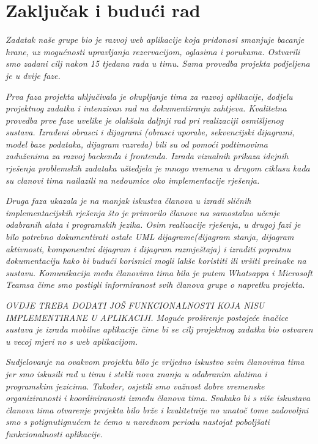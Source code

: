 \chapter{Zaključak i budući rad}
		
		 \textit{Zadatak naše grupe bio je razvoj web aplikacije koja pridonosi smanjuje bacanje hrane, uz mogućnosti upravljanja rezervacijom, oglasima i porukama. Ostvarili smo zadani cilj nakon 15 tjedana rada u timu. Sama provedba projekta podjeljena je u dvije faze.}
		 
		 \textit{Prva faza projekta uključivala je okupljanje tima za razvoj aplikacije, dodjelu projektnog zadatka i intenzivan rad na dokumentiranju zahtjeva. Kvalitetna provedba prve faze uvelike je olakšala daljnji rad pri realizaciji osmišljenog sustava. Izrađeni obrasci i dijagrami (obrasci uporabe, sekvencijski dijagrami, model baze podataka, dijagram razreda) bili su od pomoći podtimovima zaduženima za razvoj backenda i frontenda. Izrada vizualnih prikaza idejnih rješenja problemskih zadataka uštedjela je mnogo vremena u drugom ciklusu kada su clanovi tima nailazili na nedoumice oko implementacije rješenja.}
		 
		 \textit{Druga faza ukazala je na manjak iskustva članova u izradi sličnih implementacijskih rješenja što je primorilo članove na samostalno učenje odabranih alata i programskih jezika. Osim realizacije rješenja, u drugoj fazi je bilo potrebno dokumentirati ostale UML dijagrame(dijagram stanja, dijagram aktivnosti, komponentni dijagram i dijagram razmještaja) i izraditi popratnu dokumentaciju kako bi budući korisnici mogli lakše koristiti ili vršiti preinake na sustavu. Komunikacija među članovima tima bila je putem Whatsappa i Microsoft Teamsa čime smo postigli informiranost svih članova grupe o napretku projekta. }
		 
		 \textit{OVDJE TREBA DODATI JOŠ FUNKCIONALNOSTI KOJA NISU IMPLEMENTIRANE U APLIKACIJI. Moguće proširenje postojeće inačice sustava je izrada mobilne aplikacije čime bi se cilj projektnog zadatka bio ostvaren u vecoj mjeri no s web aplikacijom.}
		 
		 \textit{Sudjelovanje na ovakvom projektu bilo je vrijedno iskustvo svim članovima tima jer smo iskusili rad u timu i stekli nova znanja u odabranim alatima i programskim jezicima. Takoder, osjetili smo važnost dobre vremenske organiziranosti i koordiniranosti između članova tima. Svakako bi s više iskustava članova tima otvarenje projekta bilo brže i kvalitetnije no unatoč tome zadovoljni smo s potignutignućem te ćemo u narednom periodu nastojat poboljšati funkcionalnosti aplikacije.}
		
		\eject 